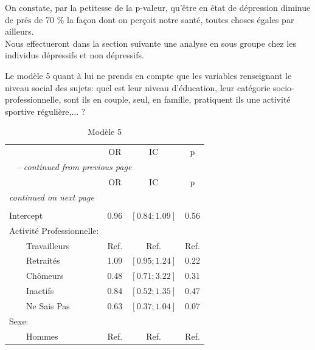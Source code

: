 \documentclass{book}
\begin{document}
\noindent
On constate, par la petitesse de la p-valeur, qu'être en état de dépression diminue de prés de 70 $\%$ la façon dont on perçoit notre santé, toutes choses égales par ailleurs.\\
\noindent
Nous effectueront dans la section suivante une analyse en sous groupe chez les individus dépressifs et non dépressifs.



Le modèle 5 quant à lui ne prends en compte que les variables renseignant le niveau social des sujets: quel est leur niveau d'éducation, leur catégorie socio-professionnelle, sont ils en couple, seul, en famille, pratiquent ils une activité sportive régulière,... ?\\

\begin{longtable}{lccc}\caption{Modèle 5}\\
    \hline  
		& \multirow{2}{*}{OR} & \multirow{2}{*}{IC}& \multirow{2}{*}{p}\\ 
		 &    				    &    			    &                  \\ 
   \hline
    \hline     
    \endfirsthead 
    \multicolumn{4}{l}{\tablename\ \thetable{} \textit{-- continued from previous page}}\\ 
    \hline
		& \multirow{2}{*}{OR} & \multirow{2}{*}{IC}& \multirow{2}{*}{p}\\ 
		&    				    &    			    &                  \\ 
    \hline
    \hline  
    \endhead   
    \hline
    \multicolumn{4}{l}{\textit{continued on next page}} \\ 
    \endfoot   
    \multicolumn{4}{l}{}  \\ 
    \endlastfoot  
Intercept & 0.96 & $\left[0.84 ; 1.09 \right]$ & 0.56\\
Activité Professionnelle: &              &              &	\\ 
$\qquad$Travailleurs 		&		Ref.		& 	Ref.		&	Ref.\\ 
$\qquad$Retraités&1.09 &$\left[0.95 ; 1.24 \right]$ & 0.22\\ 
$\qquad$Chômeurs & 0.48& $\left[0.71 ; 3.22\right]$& 0.31\\ 
$\qquad$Inactifs  & 0.84& $\left[0.52 ; 1.35\right]$& 0.47\\ 
$\qquad$Ne Sais Pas & 0.63& $\left[0.37 ; 1.04\right]$ & 0.07 \\ 
Sexe: &              &              &                          \\ 
$\qquad$Hommes &Ref. & Ref.& Ref.\\ 

\end{longtable}
\end{document}
